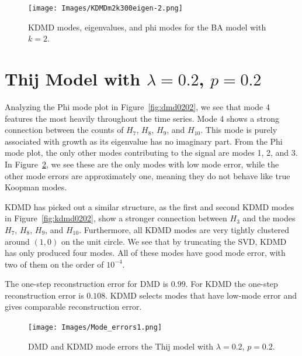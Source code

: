 \begin{figure}
    \texttt{[image: Images/KDMDm2k300eigen-2.png]}
    \centering
    \caption{KDMD modes, eigenvalues, and phi modes for the BA model
                with $k=2$. \label{fig:KDMDBA2}}
\end{figure}


\section{Thij Model with \texorpdfstring{$\lambda=0.2$, $p=0.2$}{l,p}}
Analyzing the Phi mode plot in Figure~\ref{fig:dmd0202}, we see that mode 4 features
the most heavily throughout the time series. Mode 4 shows a strong connection between
the counts of $H_{7}$, $H_{8}$, $H_{9}$, and $H_{10}$. This mode is purely associated with
growth as its eigenvalue has no imaginary part. From the Phi mode plot, the only
other modes contributing to the signal are modes 1, 2, and 3. In Figure~\ref{fig:0202modeerrors},
we see these are the only modes with low mode error, while the other mode errors are approximately one,
meaning they do not behave like true Koopman modes. 

KDMD has picked out a similar structure, as the first and second KDMD modes in Figure~\ref{fig:kdmd0202}, show
 a stronger connection between $H_{3}$ and the modes $H_{7}$, $H_{8}$, $H_{9}$, and $H_{10}$. Furthermore, all
KDMD modes are very tightly clustered around $(1,0)$ on the unit circle. We see that by truncating the SVD,
KDMD has only produced four modes. All of these modes have good mode error, with two of them on the 
order of $10^{-4}$.

The one-step reconstruction error for DMD is $0.99$. For KDMD the one-step reconstruction error is $0.108$. 
KDMD selects modes that have low-mode error and gives comparable reconstruction error.

\begin{figure}
    \texttt{[image: Images/Mode\_errors1.png]}
    \centering
    \caption{DMD and KDMD mode errors the Thij model with $\lambda=0.2$, $p=0.2$. \label{fig:0202modeerrors}}
\end{figure}



